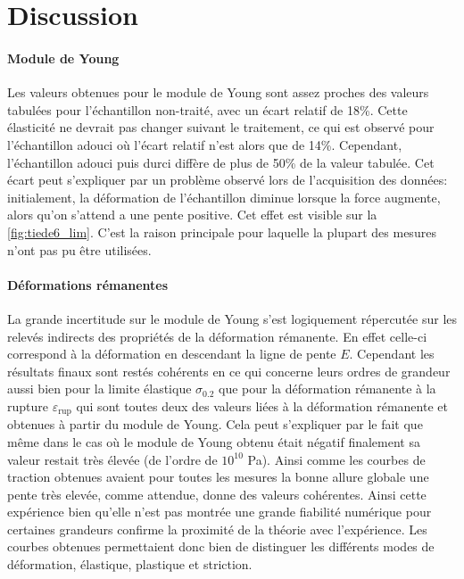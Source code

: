 \section{Discussion}
\paragraph{Module de Young}
Les valeurs obtenues pour le module de Young sont assez proches des valeurs tabulées pour l'échantillon non-traité, avec un écart relatif de 18\%. Cette élasticité ne devrait pas changer suivant le traitement, ce qui est observé pour l'échantillon adouci où l'écart relatif n'est alors que de 14\%. Cependant, l'échantillon adouci puis durci diffère de plus de 50\% de la valeur tabulée. Cet écart peut s'expliquer par un problème observé lors de l'acquisition des données: initialement, la déformation de l'échantillon diminue lorsque la force augmente, alors qu'on s'attend a une pente positive. Cet effet est visible sur la \autoref{fig:tiede6_lim}. C'est la raison principale pour laquelle la plupart des mesures n'ont pas pu être utilisées.

\paragraph{Déformations rémanentes}
La grande incertitude sur le module de Young s'est logiquement répercutée sur les relevés indirects des propriétés de la déformation rémanente. En effet celle-ci correspond à la déformation en descendant la ligne de pente $E$. Cependant les résultats finaux sont restés cohérents en ce qui concerne leurs ordres de grandeur aussi bien pour la limite élastique $\sigma_{0.2}$ que pour la déformation rémanente à la rupture $\varepsilon_\mathrm{rup}$ qui sont toutes deux des valeurs liées à la déformation rémanente et obtenues à partir du module de Young. Cela peut s'expliquer par le fait que même dans le cas où le module de Young obtenu était négatif finalement sa valeur restait très élevée (de l'ordre de $10^{10}$ \si{\pascal}). Ainsi comme les courbes de traction obtenues avaient pour toutes les mesures la bonne allure globale une pente très elevée, comme attendue, donne des valeurs cohérentes. Ainsi cette expérience bien qu'elle n'est pas montrée une grande fiabilité numérique pour certaines grandeurs confirme la proximité de la théorie avec l'expérience. Les courbes obtenues permettaient donc bien de distinguer les différents modes de déformation, élastique, plastique et striction.

